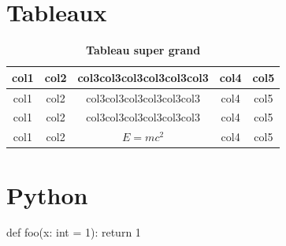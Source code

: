 ﻿\documentclass{article}
\begin{document}
\section{Tableaux} \label{sec:tableaux}

\begin{table}[ht]
\centering

\caption{\textbf{Tableau super grand}}
\label{tab:super grand}
\begin{tabular}{cc|ccc}
\toprule
\toprule
col1 & col2 & col3col3col3col3col3col3 & col4 & col5 \\
\midrule
col1 & col2 & col3col3col3col3col3col3 & col4 & col5 \\
col1 & col2 & col3col3col3col3col3col3 & col4 & col5 \\
col1 & col2 & $E = mc^2$ & col4 & col5 \\
\midrule
\midrule
\end{tabular}
\end{table}


\section{Python} \label{sec:python}
\begin{python}
def foo(x: int = 1):
    return 1
\end{python}
\end{document}
